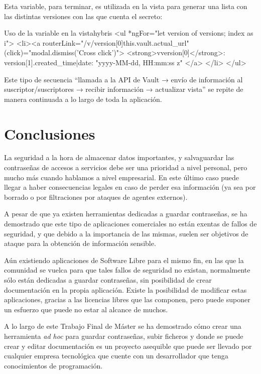 \documentclass{\ClassPath/viu-tfm-template}
\begin{document}
Esta variable, para terminar, es utilizada en la vista para generar una lista con las distintas versiones con las que cuenta el secreto:

\begin{mycode}{Uso de la variable  en la vista}{hybris}{}
<ul *ngFor="let version of versions; index as i">
  <li><a routerLink="/v/{{version[0]}}{{this.vault.actual_url}}"
    (click)="modal.dismiss('Cross click')">
      <strong>v{{version[0]}}</strong>:
        {{version[1].created_time|date: "yyyy-MM-dd, HH:mm:ss z"}}
    </a>
  </li>
</ul>
\end{mycode}

Este tipo de secuencia “llamada a la API de Vault → envío de información al suscriptor/suscriptores → recibir información → actualizar vista” se repite de manera continuada a lo largo de toda la aplicación.


\vfill
\pagebreak
\chapter{Conclusiones}

La seguridad a la hora de almacenar datos importantes, y salvaguardar las contraseñas de accesos a servicios debe ser una prioridad a nivel personal, pero mucho más cuando hablamos a nivel empresarial. En este último caso puede llegar a haber consecuencias legales en caso de perder esa información (ya sea por borrado o por filtraciones por ataques de agentes externos).

A pesar de que ya existen herramientas dedicadas a guardar contraseñas, se ha demostrado que este tipo de aplicaciones comerciales no están exentas de fallos de seguridad, y que debido a la importancia de las mismas, suelen ser objetivos de ataque para la obtención de información sensible.

Aún existiendo aplicaciones de Software Libre para el mismo fin, en las que la comunidad se vuelca para que tales fallos de seguridad no existan, normalmente sólo están dedicadas a guardar contraseñas, sin posibilidad de crear documentación en la propia aplicación. Existe la posibilidad de modificar estas aplicaciones, gracias a las licencias libres que las componen, pero puede suponer un esfuerzo que puede no estar al alcance de muchos.


A lo largo de este Trabajo Final de Máster se ha demostrado cómo crear una herramienta \textit{ad hoc} para guardar contraseñas, subir ficheros y donde se puede crear y editar documentación es un proyecto asequible que puede ser llevado por cualquier empresa tecnológica que cuente con un desarrollador que tenga conocimientos de programación.
\end{document}
